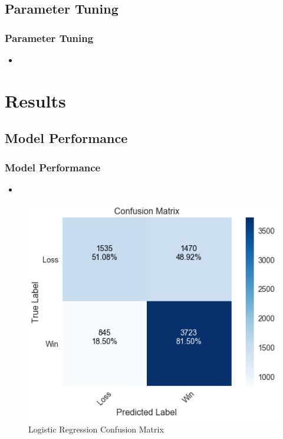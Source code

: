 \documentclass{beamer}
\begin{document}
\subsection{Parameter Tuning}
\begin{frame}
\frametitle{Parameter Tuning}
\begin{itemize}
    \item
\end{itemize}
\end{frame}

\section{Results}

\subsection{Model Performance}
\begin{frame}
\frametitle{Model Performance}
\begin{itemize}
    \item
\end{itemize}
\begin{figure}
\includegraphics[scale=0.35]{../docs/assets/images/model-performance/logistic-regression-confusion-matrix.png}
\caption{Logistic Regression Confusion Matrix}
\end{figure}
\end{frame}
\end{document}
